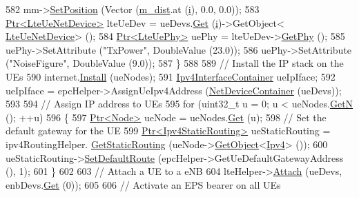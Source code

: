 \begin{DoxyCode}
582       mm->\hyperlink{classns3_1_1MobilityModel_ac584b3d5a309709d2f13ed6ada1e7640}{SetPosition} (Vector (\hyperlink{classLenaPssFfMacSchedulerTestCase2_afef642ef7109b14e75e78696f65febe2}{m\_dist}.at (\hyperlink{bernuolliDistribution_8m_a6f6ccfcf58b31cb6412107d9d5281426}{i}), 0.0, 0.0));
583       \hyperlink{classns3_1_1Ptr}{Ptr<LteUeNetDevice>} lteUeDev = ueDevs.\hyperlink{classns3_1_1NetDeviceContainer_a677d62594b5c9d2dea155cc5045f4d0b}{Get} (\hyperlink{bernuolliDistribution_8m_a6f6ccfcf58b31cb6412107d9d5281426}{i})->GetObject<
      \hyperlink{classns3_1_1LteUeNetDevice}{LteUeNetDevice}> ();
584       \hyperlink{classns3_1_1Ptr}{Ptr<LteUePhy>} uePhy = lteUeDev->\hyperlink{classns3_1_1LteUeNetDevice_a2a9940a1e457a8bf3dae87fed4199c7a}{GetPhy} ();
585       uePhy->SetAttribute (\textcolor{stringliteral}{"TxPower"}, DoubleValue (23.0));
586       uePhy->SetAttribute (\textcolor{stringliteral}{"NoiseFigure"}, DoubleValue (9.0));
587     \}
588 
589   \textcolor{comment}{// Install the IP stack on the UEs}
590   internet.\hyperlink{classns3_1_1InternetStackHelper_a6645b412f31283d2d9bc3d8a95cebbc0}{Install} (ueNodes);
591   \hyperlink{classns3_1_1Ipv4InterfaceContainer}{Ipv4InterfaceContainer} ueIpIface;
592   ueIpIface = epcHelper->AssignUeIpv4Address (\hyperlink{classns3_1_1NetDeviceContainer}{NetDeviceContainer} (ueDevs));
593 
594   \textcolor{comment}{// Assign IP address to UEs}
595   \textcolor{keywordflow}{for} (uint32\_t u = 0; u < ueNodes.\hyperlink{classns3_1_1NodeContainer_aed647ac56d0407a7706aba02eb44b951}{GetN} (); ++u)
596     \{
597       \hyperlink{classns3_1_1Ptr}{Ptr<Node>} ueNode = ueNodes.\hyperlink{classns3_1_1NodeContainer_a9ed96e2ecc22e0f5a3d4842eb9bf90bf}{Get} (u);
598       \textcolor{comment}{// Set the default gateway for the UE}
599       \hyperlink{classns3_1_1Ptr}{Ptr<Ipv4StaticRouting>} ueStaticRouting = ipv4RoutingHelper.
      \hyperlink{classns3_1_1Ipv4StaticRoutingHelper_a731206e50d305695dac7fb2ef963a4bb}{GetStaticRouting} (ueNode->\hyperlink{classns3_1_1Object_a13e18c00017096c8381eb651d5bd0783}{GetObject}<\hyperlink{classns3_1_1Ipv4}{Ipv4}> ());
600       ueStaticRouting->\hyperlink{classns3_1_1Ipv4StaticRouting_aee30fa3246c2b42f122dabdff2725331}{SetDefaultRoute} (epcHelper->GetUeDefaultGatewayAddress (), 1);
601     \}
602 
603   \textcolor{comment}{// Attach a UE to a eNB}
604   lteHelper->\hyperlink{classns3_1_1LteHelper_a9466743f826aa2652a87907b7f0a1c87}{Attach} (ueDevs, enbDevs.\hyperlink{classns3_1_1NetDeviceContainer_a677d62594b5c9d2dea155cc5045f4d0b}{Get} (0));
605 
606   \textcolor{comment}{// Activate an EPS bearer on all UEs}

\end{DoxyCode}
